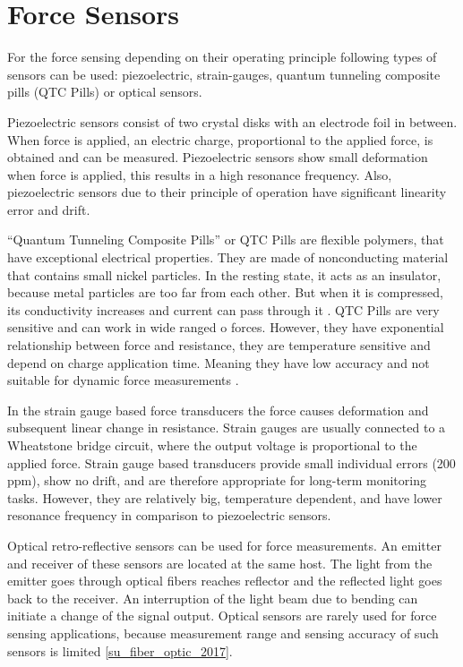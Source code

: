 \section{Force Sensors}
\label{sec:ForceSensors}

For the force sensing depending on their operating principle following types of sensors can be used: piezoelectric, strain-gauges, quantum tunneling composite pills (QTC Pills) or optical sensors. \cite{SGandP1}

Piezoelectric sensors consist of two crystal disks with an electrode foil in between. When force is applied, an electric charge, proportional to the applied force, is obtained and can be measured. Piezoelectric sensors show small deformation when force is applied, this results in a high resonance frequency. Also, piezoelectric sensors due to their principle of operation have significant linearity error and drift. \cite{SGandP2}

“Quantum Tunneling Composite Pills” or QTC Pills are flexible polymers, that have exceptional electrical properties. They are made of nonconducting material that contains small nickel particles.  In the resting state, it acts as an insulator, because metal particles are too far from each other. But when it is compressed, its conductivity increases and current can pass through it \cite{azaman_characteristic_2016}. QTC Pills are very sensitive and can work in wide ranged o forces. However, they have exponential relationship between force and resistance, they are temperature sensitive and depend on charge application time. Meaning they have low accuracy and not suitable for dynamic force measurements \cite{_quantum_2010}.

In the strain gauge based force transducers the force causes deformation and subsequent linear change in resistance. Strain gauges are usually connected to a Wheatstone bridge circuit, where the output voltage is proportional to the applied force. Strain gauge based transducers provide small individual errors (200 ppm), show no drift, and are therefore appropriate for long-term monitoring tasks. However, they are relatively big, temperature dependent, and have lower resonance frequency in comparison to piezoelectric sensors. \cite{SGandP1,SGandP2}

Optical retro-reflective sensors can be used for force measurements. An emitter and receiver of these sensors are located at the same host. The light from the emitter goes through optical fibers reaches reflector and the reflected light goes back to the receiver. An interruption of the light beam due to bending can initiate a change of the signal output. Optical sensors are rarely used for force sensing applications, because measurement range and sensing accuracy of such sensors is limited \ref{su_fiber_optic_2017}.

